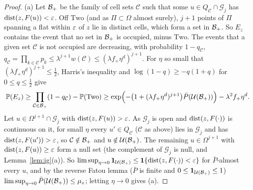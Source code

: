 \documentclass[11pt]{article}
\begin{document}
\begin{proof}
(a) Let $\mathcal{B}_+$ be the family of cell sets $\mathcal C$ such that some $u\in Q_{\mathcal C}\cap\mathcal G_j$ has $\operatorname{dist}(z,F(u))<\varepsilon$. Off $\mathrm{Two}$ (and as
$\Pi\subset\Omega$ almost surely), $j+1$ points of $\Pi$ spanning a flat within $\varepsilon$ of $z$ lie in distinct cells, which form a set in
$\mathcal{B}_+$. So $E_z$ contains the event that no set in $\mathcal{B}_+$ is occupied, minus $\mathrm{Two}$. The events that a given set $\mathcal C$ is not
occupied are decreasing, with probability $1-q_{\mathcal C}$, $q_{\mathcal C}=\prod_{k\in\mathcal C}p_k\le\lambda^{j+1}w(\mathcal C)\le(\lambda f_+\eta^d)^{j+1}$. For $\eta$
so small that $(\lambda f_+\eta^d)^{j+1}\le\frac12$, Harris's inequality and $\log(1-q)\ge-q(1+q)$ for $0\le q\le\frac12$ give
\[
  \mathbb{P}(E_z)\ge\prod_{\mathcal C\in\mathcal{B}_+}(1-q_{\mathcal C})-\mathbb{P}(\mathrm{Two})\ge\exp\Bigl(-\bigl(1+(\lambda f_+\eta^d)^{j+1}\bigr)\bar P(\mathcal U(\mathcal{B}_+))\Bigr)-\lambda^2f_+\eta^d.
\]
Let $u\in\Omega^{j+1}\cap\mathcal G_j$ with $\operatorname{dist}(z,F(u))>\varepsilon$. As $\mathcal G_j$ is open and $\operatorname{dist}(z,F(\cdot))$ is continuous on it, for small $\eta$
every $u'\in Q_{\mathcal C}$ ($\mathcal C$ as above) lies in $\mathcal G_j$ and has $\operatorname{dist}(z,F(u'))>\varepsilon$, so $\mathcal C\notin\mathcal{B}_+$ and $u\notin\mathcal U(\mathcal{B}_+)$. The
remaining $u\in\Omega^{j+1}$ with $\operatorname{dist}(z,F(u))\ge\varepsilon$ form a null set (the complement of $\mathcal G_j$ is null, and
Lemma~\ref{lem:ig}(a)). So $\limsup_{\eta\to0}\mathbf{1}_{\mathcal U(\mathcal{B}_+)}\le\mathbf{1}\{\operatorname{dist}(z,F(\cdot))<\varepsilon\}$ for $\bar P$-almost every $u$, and by
the reverse Fatou lemma ($\bar P$ is finite and $0\le\mathbf{1}_{\mathcal U(\mathcal{B}_+)}\le1$) $\limsup_{\eta\to0}\bar P(\mathcal U(\mathcal{B}_+))\le\mu_z$; letting $\eta\to0$ gives (a).


\end{proof}
\end{document}
